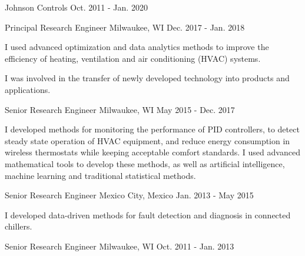 

\begin{cventries}

\cvmultientry
{Johnson Controls} %
{}
{Oct. 2011 - Jan. 2020} %
{
\cvsubentry
{Principal Research Engineer} %
{Milwaukee, WI} %
{Dec. 2017 - Jan. 2018} %
{
\begin{cvitems} %
\item {I used advanced optimization and data analytics methods to improve the efficiency of heating, ventilation and air conditioning (HVAC) systems.}
\item {I was involved in the transfer of newly developed technology into products and applications.}
\end{cvitems}
}
\cvsubentry
{Senior Research Engineer} %
{Milwaukee, WI} %
{May 2015 - Dec. 2017} %
{
\begin{cvitems} %
\item {I developed methods for monitoring the performance of PID controllers, to detect steady state operation of HVAC equipment, and reduce energy consumption in wireless thermostats while keeping acceptable comfort standards. I used advanced mathematical tools to develop these methods, as well as artificial intelligence, machine learning and traditional statistical methods.}
\end{cvitems}
}
\cvsubentry
{Senior Research Engineer} %
{Mexico City, Mexico} %
{Jan. 2013 - May 2015} %
{
\begin{cvitems} %
\item {I developed data-driven methods for fault detection and diagnosis in connected chillers.}
\end{cvitems}
}
\cvsubentry
{Senior Research Engineer} %
{Milwaukee, WI} %
{Oct. 2011 - Jan. 2013} %
}
\end{cventries}
